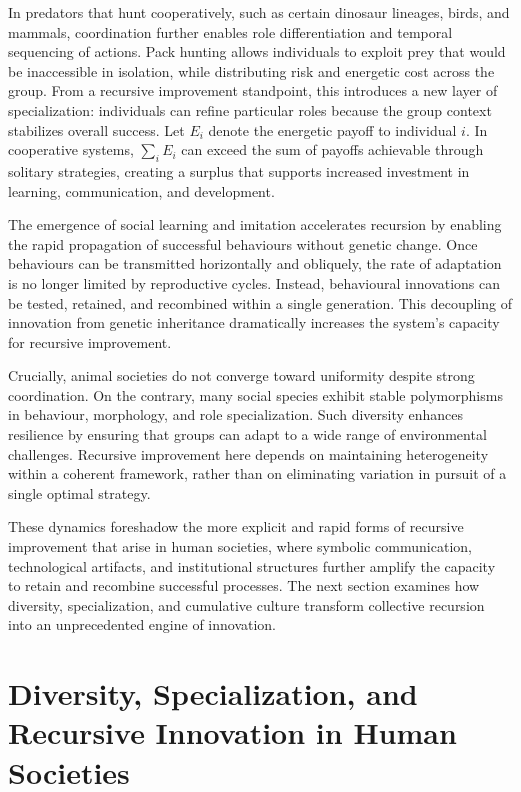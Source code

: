 \documentclass[11pt]{article}
\begin{document}
In predators that hunt cooperatively, such as certain dinosaur lineages, birds, and mammals, coordination further enables role differentiation and temporal sequencing of actions. Pack hunting allows individuals to exploit prey that would be inaccessible in isolation, while distributing risk and energetic cost across the group. From a recursive improvement standpoint, this introduces a new layer of specialization: individuals can refine particular roles because the group context stabilizes overall success. Let $E_i$ denote the energetic payoff to individual $i$. In cooperative systems, $\sum_i E_i$ can exceed the sum of payoffs achievable through solitary strategies, creating a surplus that supports increased investment in learning, communication, and development.

The emergence of social learning and imitation accelerates recursion by enabling the rapid propagation of successful behaviours without genetic change. Once behaviours can be transmitted horizontally and obliquely, the rate of adaptation is no longer limited by reproductive cycles. Instead, behavioural innovations can be tested, retained, and recombined within a single generation. This decoupling of innovation from genetic inheritance dramatically increases the system’s capacity for recursive improvement.

Crucially, animal societies do not converge toward uniformity despite strong coordination. On the contrary, many social species exhibit stable polymorphisms in behaviour, morphology, and role specialization. Such diversity enhances resilience by ensuring that groups can adapt to a wide range of environmental challenges. Recursive improvement here depends on maintaining heterogeneity within a coherent framework, rather than on eliminating variation in pursuit of a single optimal strategy.

These dynamics foreshadow the more explicit and rapid forms of recursive improvement that arise in human societies, where symbolic communication, technological artifacts, and institutional structures further amplify the capacity to retain and recombine successful processes. The next section examines how diversity, specialization, and cumulative culture transform collective recursion into an unprecedented engine of innovation.

\section{Diversity, Specialization, and Recursive Innovation in Human Societies}
\end{document}
